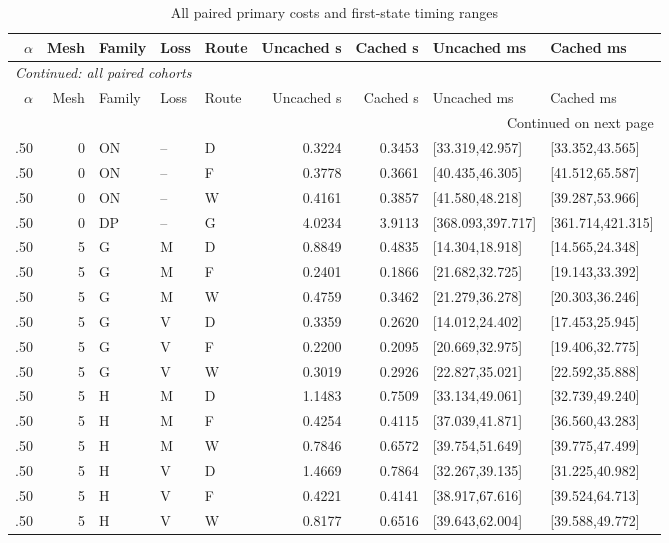 {\scriptsize\setlength{\tabcolsep}{3pt}
\begin{longtable}{rrlllrrll}
\caption{All paired primary costs and first-state timing ranges}\label{tab:cacheall126}\\
\toprule $\alpha$ & Mesh & Family & Loss & Route & Uncached s & Cached s & Uncached ms & Cached ms\\\midrule\endfirsthead
\multicolumn{9}{l}{\textit{Continued: all paired cohorts}}\\
\toprule $\alpha$ & Mesh & Family & Loss & Route & Uncached s & Cached s & Uncached ms & Cached ms\\\midrule\endhead
\midrule\multicolumn{9}{r}{Continued on next page}\\\endfoot
\bottomrule\endlastfoot
.50 & 0 & ON & -- & D & 0.3224 & 0.3453 & [33.319,42.957] & [33.352,43.565]\\
.50 & 0 & ON & -- & F & 0.3778 & 0.3661 & [40.435,46.305] & [41.512,65.587]\\
.50 & 0 & ON & -- & W & 0.4161 & 0.3857 & [41.580,48.218] & [39.287,53.966]\\
.50 & 0 & DP & -- & G & 4.0234 & 3.9113 & [368.093,397.717] & [361.714,421.315]\\
.50 & 5 & G & M & D & 0.8849 & 0.4835 & [14.304,18.918] & [14.565,24.348]\\
.50 & 5 & G & M & F & 0.2401 & 0.1866 & [21.682,32.725] & [19.143,33.392]\\
.50 & 5 & G & M & W & 0.4759 & 0.3462 & [21.279,36.278] & [20.303,36.246]\\
.50 & 5 & G & V & D & 0.3359 & 0.2620 & [14.012,24.402] & [17.453,25.945]\\
.50 & 5 & G & V & F & 0.2200 & 0.2095 & [20.669,32.975] & [19.406,32.775]\\
.50 & 5 & G & V & W & 0.3019 & 0.2926 & [22.827,35.021] & [22.592,35.888]\\
.50 & 5 & H & M & D & 1.1483 & 0.7509 & [33.134,49.061] & [32.739,49.240]\\
.50 & 5 & H & M & F & 0.4254 & 0.4115 & [37.039,41.871] & [36.560,43.283]\\
.50 & 5 & H & M & W & 0.7846 & 0.6572 & [39.754,51.649] & [39.775,47.499]\\
.50 & 5 & H & V & D & 1.4669 & 0.7864 & [32.267,39.135] & [31.225,40.982]\\
.50 & 5 & H & V & F & 0.4221 & 0.4141 & [38.917,67.616] & [39.524,64.713]\\
.50 & 5 & H & V & W & 0.8177 & 0.6516 & [39.643,62.004] & [39.588,49.772]\\

\end{longtable}}
